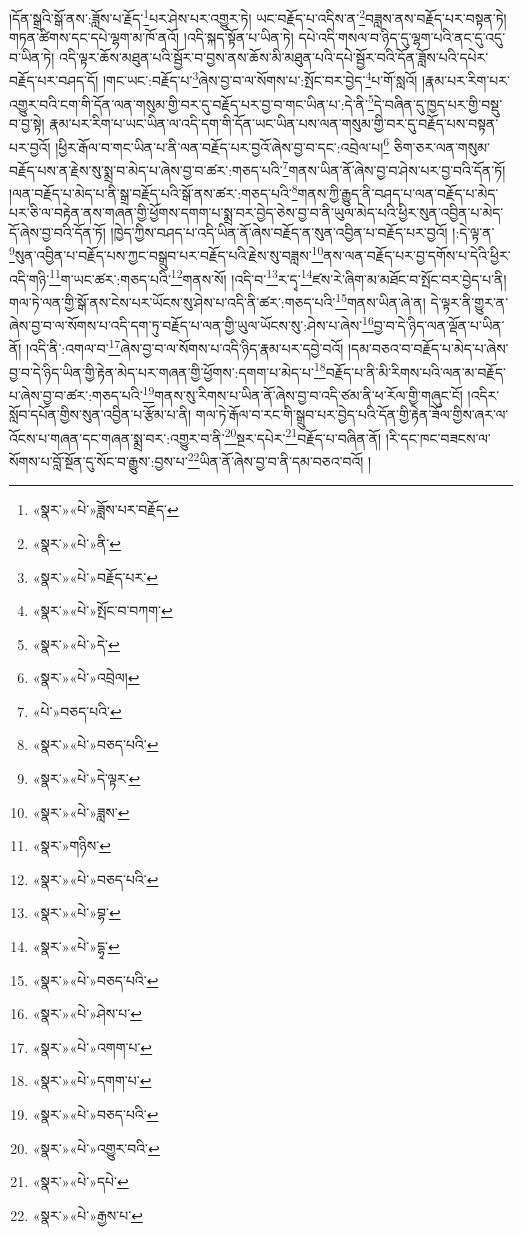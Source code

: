 །དོན་སྒྲའི་སྒོ་ནས་:ཟློས་པ་རྗོད་\footnote{«སྣར་»«པེ་»ཟློས་པར་བརྗོད་}པར་ཤེས་པར་འགྱུར་ཏེ། ཡང་བརྗོད་པ་འདིས་ན་\footnote{«སྣར་»«པེ་»ནི་}བཟླས་ནས་བརྗོད་པར་བསྟན་ཏེ། གཏན་ཚིགས་དང་དཔེ་ལྷག་མ་ཁོ་ནའོ། །འདི་སྐད་སྟོན་པ་ཡིན་ཏེ། དཔེ་འདི་གསལ་བ་ཉིད་དུ་ལྷག་པའི་ནང་དུ་འདུ་བ་ཡིན་ཏེ། འདི་ལྟར་ཆོས་མཐུན་པའི་སྦྱོར་བ་བྱས་ནས་ཆོས་མི་མཐུན་པའི་དཔེ་སྦྱོར་བའི་དོན་ཟློས་པའི་དཔེར་བརྗོད་པར་བཤད་དོ། །གང་ཡང་:བརྗོད་པ་\footnote{«སྣར་»«པེ་»བརྗོད་པར་}ཞེས་བྱ་བ་ལ་སོགས་པ་:སྤོང་བར་བྱེད་\footnote{«སྣར་»«པེ་»སྤོང་བ་བཀག་}པ་གོ་སླའོ། །རྣམ་པར་རིག་པར་འགྱུར་བའི་ངག་གི་དོན་ལན་གསུམ་གྱི་བར་དུ་བརྗོད་པར་བྱ་བ་གང་ཡིན་པ་:དེ་ནི་\footnote{«སྣར་»«པེ་»དེ་}དེ་བཞིན་དུ་ཁྱད་པར་གྱི་བསྡུ་བ་བྱ་སྟེ། རྣམ་པར་རིག་པ་ཡང་ཡིན་ལ་འདི་དག་གི་དོན་ཡང་ཡིན་པས་ལན་གསུམ་གྱི་བར་དུ་བརྗོད་པས་བསྟན་པར་བྱའོ། །ཕྱིར་རྒོལ་བ་གང་ཡིན་པ་ནི་ལན་བརྗོད་པར་བྱའོ་ཞེས་བྱ་བ་དང་:འབྲེལ་པ།\footnote{«སྣར་»«པེ་»འབྲེལ།} ཅིག་ཅར་ལན་གསུམ་བརྗོད་པས་ན་རྗེས་སུ་སྨྲ་བ་མེད་པ་ཞེས་བྱ་བ་ཚར་:གཅད་པའི་\footnote{«པེ་»བཅད་པའི་}གནས་ཡིན་ནོ་ཞེས་བྱ་བ་ཤེས་པར་བྱ་བའི་དོན་ཏོ། །ལན་བརྗོད་པ་མེད་པ་ནི་སྒྲ་བརྗོད་པའི་སྒོ་ནས་ཚར་:གཅད་པའི་\footnote{«སྣར་»«པེ་»བཅད་པའི་}གནས་ཀྱི་རྒྱུད་ནི་བཤད་པ་ལན་བརྗོད་པ་མེད་པར་ཅི་ལ་བརྟེན་ནས་གཞན་གྱི་ཕྱོགས་དགག་པ་སྨྲ་བར་བྱེད་ཅེས་བྱ་བ་ནི་ཡུལ་མེད་པའི་ཕྱིར་སུན་འབྱིན་པ་མེད་དོ་ཞེས་བྱ་བའི་དོན་ཏོ། །ཁྱེད་ཀྱིས་བཤད་པ་འདི་ཡིན་ནོ་ཞེས་བརྗོད་ན་སུན་འབྱིན་པ་བརྗོད་པར་བྱའོ། །:དེ་ལྟ་ན་\footnote{«སྣར་»«པེ་»དེ་ལྟར་}སུན་འབྱིན་པ་བརྗོད་པས་ཀྱང་བསྒྲུབ་པར་བརྗོད་པའི་རྗེས་སུ་བཟླས་\footnote{«སྣར་»«པེ་»ཟླས་}ནས་ལན་བརྗོད་པར་བྱ་དགོས་པ་དེའི་ཕྱིར་འདི་གཉི་\footnote{«སྣར་»གཉིས་}ག་ཡང་ཚར་:གཅད་པའི་\footnote{«སྣར་»«པེ་»བཅད་པའི་}གནས་སོ། །འདི་བ་\footnote{«སྣར་»«པེ་»བྷ་}ར་དྭ་\footnote{«སྣར་»«པེ་»དྷྭ་}ཛས་རེ་ཞིག་མ་མཐོང་བ་སྤོང་བར་བྱེད་པ་ནི། གལ་ཏེ་ལན་གྱི་སྒོ་ནས་ངེས་པར་ཡོངས་སུ་ཤེས་པ་འདི་ནི་ཚར་:གཅད་པའི་\footnote{«སྣར་»«པེ་»བཅད་པའི་}གནས་ཡིན་ཞེ་ན། དེ་ལྟར་ནི་གྱུར་ན་ཞེས་བྱ་བ་ལ་སོགས་པ་འདི་དག་ཏུ་བརྗོད་པ་ལན་གྱི་ཡུལ་ཡོངས་སུ་:ཤེས་པ་ཞེས་\footnote{«སྣར་»«པེ་»ཤེས་པ་}བྱ་བ་དེ་ཉིད་ལན་ལྡོན་པ་ཡིན་ནོ། །འདི་ནི་:འགལ་བ་\footnote{«སྣར་»«པེ་»འགག་པ་}ཞེས་བྱ་བ་ལ་སོགས་པ་འདི་ཉིད་རྣམ་པར་དབྱེ་བའོ། །དམ་བཅའ་བ་བརྗོད་པ་མེད་པ་ཞེས་བྱ་བ་དེ་ཉིད་ཡིན་གྱི་རྟེན་མེད་པར་གཞན་གྱི་ཕྱོགས་:དགག་པ་མེད་པ་\footnote{«སྣར་»«པེ་»དགག་པ་}བརྗོད་པ་ནི་མི་རིགས་པའི་ལན་མ་བརྗོད་པ་ཞེས་བྱ་བ་ཚར་:གཅད་པའི་\footnote{«སྣར་»«པེ་»བཅད་པའི་}གནས་སུ་རིགས་པ་ཡིན་ནོ་ཞེས་བྱ་བ་འདི་ཙམ་ནི་ཕ་རོལ་གྱི་གཞུང་ངོ། །འདིར་སློབ་དཔོན་གྱིས་སུན་འབྱིན་པ་རྩོམ་པ་ནི། གལ་ཏེ་རྒོལ་བ་རང་གི་སྒྲུབ་པར་བྱེད་པའི་དོན་གྱི་རྟེན་ཟོལ་གྱིས་ཞར་ལ་འོངས་པ་གཞན་དང་གཞན་སྨྲ་བར་:འགྱུར་བ་ནི་\footnote{«སྣར་»«པེ་»འགྱུར་བའི་}སྔར་དཔེར་\footnote{«སྣར་»«པེ་»དཔེ་}བརྗོད་པ་བཞིན་ནོ། །རི་དང་ཁང་བཟངས་ལ་སོགས་པ་བློ་སྔོན་དུ་སོང་བ་རྒྱུས་:བྱས་པ་\footnote{«སྣར་»«པེ་»རྒྱས་པ་}ཡིན་ནོ་ཞེས་བྱ་བ་ནི་དམ་བཅའ་བའོ། །
